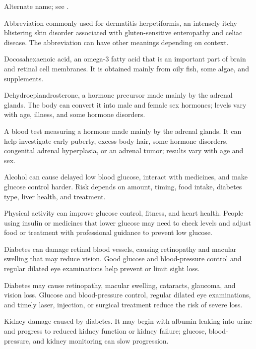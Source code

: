  Alternate name; see .

 Abbreviation commonly used for dermatitis herpetiformis, an intensely itchy blistering skin disorder associated with gluten-sensitive enteropathy and celiac disease. The abbreviation can have other meanings depending on context.

 Docosahexaenoic acid, an omega-3 fatty acid that is an important part of brain and retinal cell membranes. It is obtained mainly from oily fish, some algae, and supplements.

 Dehydroepiandrosterone, a hormone precursor made mainly by the adrenal glands. The body can convert it into male and female sex hormones; levels vary with age, illness, and some hormone disorders.

 A blood test measuring a hormone made mainly by the adrenal glands. It can help investigate early puberty, excess body hair, some hormone disorders, congenital adrenal hyperplasia, or an adrenal tumor; results vary with age and sex.

 Alcohol can cause delayed low blood glucose, interact with medicines, and make glucose control harder. Risk depends on amount, timing, food intake, diabetes type, liver health, and treatment.

 Physical activity can improve glucose control, fitness, and heart health. People using insulin or medicines that lower glucose may need to check levels and adjust food or treatment with professional guidance to prevent low glucose.

 Diabetes can damage retinal blood vessels, causing retinopathy and macular swelling that may reduce vision. Good glucose and blood-pressure control and regular dilated eye examinations help prevent or limit sight loss.

 Diabetes may cause retinopathy, macular swelling, cataracts, glaucoma, and vision loss. Glucose and blood-pressure control, regular dilated eye examinations, and timely laser, injection, or surgical treatment reduce the risk of severe loss.

 Kidney damage caused by diabetes. It may begin with albumin leaking into urine and progress to reduced kidney function or kidney failure; glucose, blood-pressure, and kidney monitoring can slow progression.

